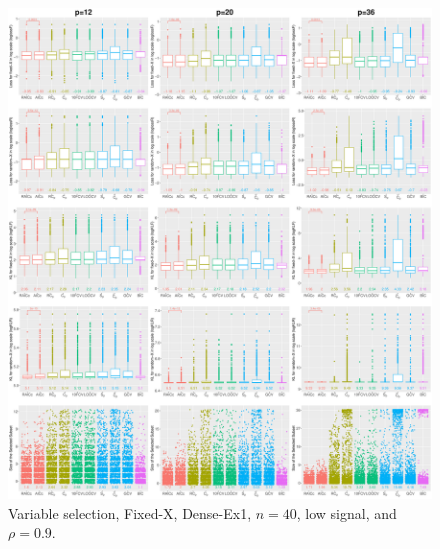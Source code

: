 \begin{figure}[!ht]
\centering
\includegraphics[width=\textwidth]{figures/supplement/fixedx/subset_selection/Dense-Ex1_n40_lsnr_rho09.eps}
\caption{Variable selection, Fixed-X, Dense-Ex1, $n=40$, low signal, and $\rho=0.9$.}
\end{figure}
\clearpage
